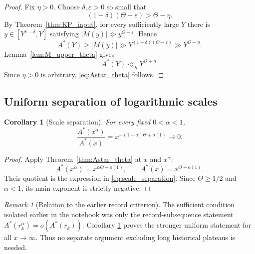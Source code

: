 \documentclass[11pt]{amsart}
\numberwithin{equation}{section}
\theoremstyle{plain}
\newtheorem{corollary}[theorem]{Corollary}
\theoremstyle{definition}
\theoremstyle{remark}
\newtheorem{remark}[theorem]{Remark}
\begin{document}
\begin{proof}
Fix \(\eta>0\).  Choose \(\delta,\varepsilon>0\) so small that
\begin{equation}
(1-\delta)(\Theta-\varepsilon)>\Theta-\eta.
\label{eq:delta_epsilon_choice}
\end{equation}
By Theorem~\ref{thm:KP_input}, for every sufficiently large \(Y\) there is
\(y\in[Y^{1-\delta},Y]\) satisfying
\(|M(y)|\gg y^{\Theta-\varepsilon}\).  Hence
\begin{equation}
A^*(Y)
\ge |M(y)|
\gg Y^{(1-\delta)(\Theta-\varepsilon)}
\gg Y^{\Theta-\eta}.
\label{eq:Astar_lower_eta}
\end{equation}
Lemma~\ref{lem:M_upper_theta} gives
\begin{equation}
A^*(Y)\ll_\eta Y^{\Theta+\eta}.
\label{eq:Astar_upper_eta}
\end{equation}
Since \(\eta>0\) is arbitrary, \eqref{eq:Astar_theta} follows.
\end{proof}

\subsection{Uniform separation of logarithmic scales}
\label{subsec:scale_separation}

\begin{corollary}[Scale separation]
\label{cor:scale_separation}
For every fixed \(0<\alpha<1\),
\begin{equation}
\boxed{
\frac{A^*(x^\alpha)}{A^*(x)}
=x^{-(1-\alpha)\Theta+o(1)}\longrightarrow0.}
\label{eq:scale_separation}
\end{equation}
\end{corollary}

\begin{proof}
Apply Theorem~\ref{thm:Astar_theta} at \(x\) and \(x^\alpha\):
\begin{equation}
A^*(x^\alpha)=x^{\alpha\Theta+o(1)},
\qquad
A^*(x)=x^{\Theta+o(1)}.
\label{eq:Astar_two_scales}
\end{equation}
Their quotient is the expression in \eqref{eq:scale_separation}.  Since
\(\Theta\ge1/2\) and \(\alpha<1\), its main exponent is strictly negative.
\end{proof}

\begin{remark}[Relation to the earlier record criterion]
\label{rem:record_criterion_closed}
The sufficient condition isolated earlier in the notebook was only the
record-subsequence statement
\(A^*(r_k^\alpha)=o(A^*(r_k))\).  Corollary
\ref{cor:scale_separation} proves the stronger uniform statement for all
\(x\to\infty\).  Thus no separate argument excluding long historical
plateaus is needed.
\end{remark}
\end{document}
